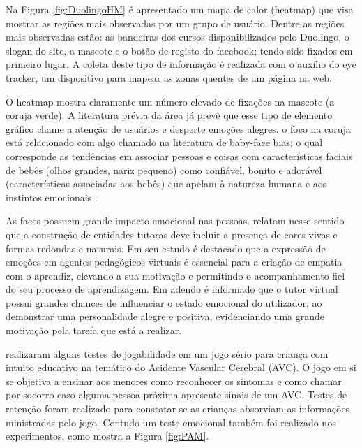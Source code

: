 \documentclass[12pt]{article}
\begin{document}
Na Figura \ref{fig:DuolingoHM} é apresentado um mapa de calor (heatmap) que visa mostrar as regiões mais observadas por um grupo de usuário. Dentre as regiões mais observadas estão: as bandeiras dos cursos disponibilizados pelo Duolingo, o slogan do site, a mascote e o botão de registo do facebook; tendo sido fixados em primeiro lugar. A coleta deste tipo de informação é realizada com o auxílio do eye tracker, um dispositivo para mapear as zonas quentes de um página na web.

O heatmap mostra claramente um número elevado de fixações na mascote (a coruja verde). A literatura prévia da área já prevê que esse tipo de elemento gráfico chame a atenção de usuários e desperte emoções alegres. o foco na coruja está relacionado com algo chamado na literatura de baby-face bias; o qual corresponde as tendências em associar pessoas e coisas com características faciais de bebês (olhos grandes, nariz pequeno) como confiável, bonito e adorável (características associadas aos bebês) que apelam à natureza humana e aos instintos emocionais \cite{walter2011designing}.

As faces possuem grande impacto emocional nas pessoas.  relatam nesse sentido que a construção de entidades tutoras deve incluir a presença de cores vivas e formas redondas e naturais. Em seu estudo é destacado que a expressão de emoções em agentes pedagógicos virtuais é essencial para a criação de empatia com o aprendiz, elevando a sua motivação e permitindo o acompanhamento fiel do seu processo de aprendizagem. Em adendo é informado que o tutor virtual possui grandes chances de influenciar o estado emocional do utilizador, ao demonstrar uma personalidade alegre e positiva, evidenciando uma grande motivação pela tarefa que está a realizar.

 realizaram alguns testes de jogabilidade em um jogo sério para criança com intuito educativo na temático do Acidente Vascular Cerebral (AVC). O jogo em si se objetiva a ensinar aos menores como reconhecer os sintomas e como chamar por socorro caso alguma pessoa próxima apresente sinais de um AVC. Testes de retenção foram realizado para constatar se as crianças absorviam as informações ministradas pelo jogo. Contudo um teste emocional também foi realizado nos experimentos, como mostra a Figura \ref{fig:PAM}.
\end{document}
